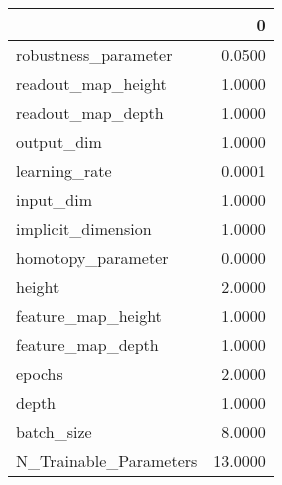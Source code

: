 \begin{tabular}{lr}
\toprule
{} &        0 \\
\midrule
robustness\_parameter   &   0.0500 \\
readout\_map\_height     &   1.0000 \\
readout\_map\_depth      &   1.0000 \\
output\_dim             &   1.0000 \\
learning\_rate          &   0.0001 \\
input\_dim              &   1.0000 \\
implicit\_dimension     &   1.0000 \\
homotopy\_parameter     &   0.0000 \\
height                 &   2.0000 \\
feature\_map\_height     &   1.0000 \\
feature\_map\_depth      &   1.0000 \\
epochs                 &   2.0000 \\
depth                  &   1.0000 \\
batch\_size             &   8.0000 \\
N\_Trainable\_Parameters &  13.0000 \\
\bottomrule
\end{tabular}
